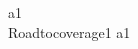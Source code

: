 
\begin{circus}
\circchannel a1 \\
\circprocess Roadtocoverage1 \circdef \circbegin
	\circspot a1 \then \Skip \\
	\circend
\end{circus}
